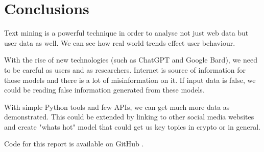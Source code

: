 \section{Conclusions}

Text mining is a powerful technique in order to analyse not just web data but user data as well. We can see how real world trends effect user behaviour. 

With the rise of new technologies (such as ChatGPT and Google Bard), we need to be careful as users and as researchers. Internet is source of information for those models and there is a lot of misinformation on it. If input data is false, we could be reading false information generated from these models.

With simple Python tools and few APIs, we can get much more data as demonstrated. This could be extended by linking to other social media websites and create "whats hot" model that could get us key topics in crypto or in general.

Code for this report is available on GitHub \parencite{web:Code}.
